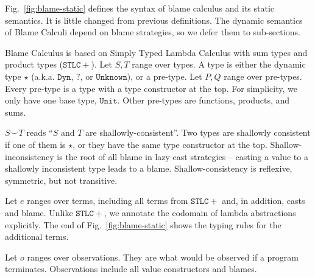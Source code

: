 \documentclass[acmsmall,review,anonymous]{acmart}\settopmatter{printfolios=true,printccs=false,printacmref=false}
\newcommand{\figref}[1]{Fig.~\ref{#1}}
\newcommand{\POOunit}[0]{\mathtt{Unit}}
\begin{document}
\figref{fig:blame-static} defines the syntax of blame calculus and its
static semantics. It is little changed from previous definitions.
  The dynamic semantics of Blame Calculi
depend on blame strategies, so we defer them to sub-sections.

Blame Calculus is based on Simply Typed Lambda Calculus with sum types and 
product types ($ \mathtt{STLC+} $). 
Let $ S,T $ range over types. A type is either the dynamic type $ \star $
(a.k.a. $ \mathtt{Dyn} $, $ \mathbb{?} $, or $ \mathtt{Unknown} $), 
or a pre-type. 
Let $ P,Q $ range over pre-types. Every pre-type is a type with a type 
constructor at the top. For simplicity, we only have one base type, $ \POOunit 
$. 
Other pre-types are functions, products, and sums.


$ S \smile T $ reads ``$ S $ and $ T $ are shallowly-consistent''. Two types 
are shallowly consistent if one of them is $ \star $, or they have the same 
type constructor at the top. Shallow-inconsistency is the root of all blame in 
lazy cast strategies -- casting a value to a shallowly inconsistent type leads 
to a blame. Shallow-consistency is reflexive, symmetric, but 
not transitive.

Let $ e $ ranges over terms, including all terms from $ \mathtt{STLC+} $ and, 
in addition, casts and blame. Unlike $ \mathtt{STLC+} $, we annotate the 
codomain of lambda abstractions explicitly.
The end of \figref{fig:blame-static} shows the typing rules for the
additional terms.

Let $ o $ ranges over observations. They are what would be observed if a 
program terminates. Observations include all value constructors and blames.
\end{document}
